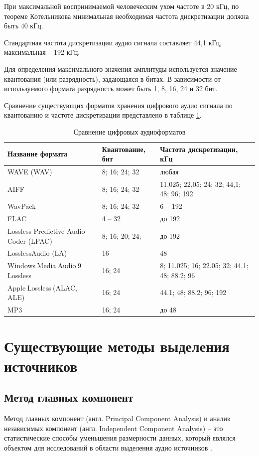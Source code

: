 При максимальной воспринимаемой человеческим ухом частоте в 20 кГц, по теореме Котельникова минимальная необходимая частота дискретизации должна быть 40 кГц.

Стандартная частота дискретизации аудио сигнала составляет 44,1 кГц, максимальная -- 192 кГц.

Для определения максимального значения амплитуды используется значение квантования (или разрядность), задающаяся в битах. В зависимости от используемого формата разрядность может быть 1, 8, 16, 24 и 32 бит.

Сравнение существующих форматов хранения цифрового аудио сигнала по квантованию и частоте дискретизации представлено в таблице \ref{anal:formats}.

\begin{table}
	\caption{\label{anal:formats}Сравнение цифровых аудиоформатов}
	\begin{center}
		\begin{tabular}{|p{}|p{}|p{}|}
			\hline
			Название формата & Квантование, бит & Частота дискретизации, кГц \\
			\hline
			WAVE (WAV) & 8; 16; 24; 32 & любая \\
			\hline
			AIFF & 8; 16; 24; 32 & 11,025; 22,05; 24; 32; 44,1; 48; 96; 192 \\
			\hline
			WavPack & 8; 16; 24; 32 & 6 -- 192 \\
			\hline
			FLAC & 4 -- 32 & до 192 \\
			\hline
			Lossless Predictive Audio Coder (LPAC) & 8; 16; 20; 24; & до 192 \\
			\hline
			LosslessAudio (LA) & 16 & 48 \\
			\hline
			Windows Media Audio 9 Lossless & 16; 24 & 8; 11.025; 16; 22.05; 32; 44.1; 48; 88.2; 96 \\
			\hline
			Apple Lossless (ALAC, ALE) & 16; 24 & 44.1; 48; 88.2; 96; 192 \\
			\hline
			MP3 & 16; 24 & до 48 \\
			\hline
		\end{tabular}
	\end{center}
\end{table}

\section{Существующие методы выделения источников}

\subsection{Метод главных компонент}
Метод главных компонент (англ. Principal Component Analysis) и анализ независимых компонент (англ. Independent Component Analysis) -- это статистические способы уменьшения размерности данных, который являлся объектом для исследований в области выделения аудио источников \cite{Lopez} \cite{Dadula}.

